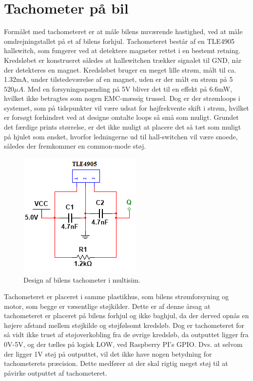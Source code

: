 \section{Tachometer på bil}

Formålet med tachometeret er at måle bilens nuværende hastighed, ved at måle omdrejningstallet på et af bilens forhjul. 
Tachometeret består af en TLE4905 \cite{lib:tle4905}
hallswitch, som fungerer ved at detektere magneter rettet i en bestemt retning. 
Kredsløbet er konstrueret således at hallswitchen trækker signalet til GND, når der detekteres en magnet. 
Kredsløbet bruger en meget lille strøm, målt til ca. 1.32mA, under tilstedeværelse af en magnet, uden er der målt en strøm på 5 $520\mu A$. 
Med en forsyningsspænding på 5V bliver det til en effekt på 6.6mW, hvilket ikke betragtes som nogen EMC-mæssig trussel. 
Dog er der strømloops i systemet, som på tidspunkter vil være udsat for højfrekvente skift i strøm, hvilket er forsøgt forhindret ved at designe omtalte loops så små som muligt. 
Grundet det færdige prints størrelse, er det ikke muligt at placere det så tæt som muligt på hjulet som ønsket, hvorfor ledningerne ud til hall-switchen vil være snoede, således der fremkommer en common-mode støj.

\begin{figure}[h]
\centering
\includegraphics[scale=1]{../fig/billeder/tachometer_multisim.png}
\caption{Design af bilens tachometer i multisim.}
\label{fig:tachometer_multisim}
\end{figure}

Tachometeret er placeret i samme plastikhus, som bilens strømforsyning og motor, som begge er væsentlige støjkilder.
Dette er af denne årsag at tachometeret er placeret på bilens forhjul og ikke baghjul, da der derved opnås en højere afstand mellem støjkilde og støjfølsomt kredsløb.
Dog er tachometeret for så vidt ikke truet af støjoverkobling fra de øvrige kredsløb, da outputtet ligger fra 0V-5V, og der tælles på logisk LOW, ved Raspberry PI's GPIO. 
Dvs. at selvom der ligger 1V støj på outputtet, vil det ikke have nogen betydning for tachometerets præcision. 
Dette medfører at der skal rigtig meget støj til at påvirke outputtet af tachometeret. 

\clearpage